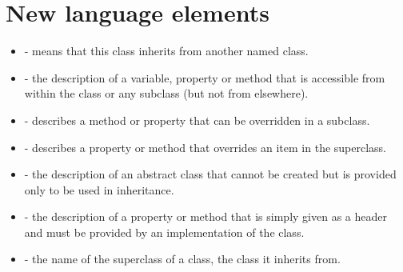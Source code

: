 	\section{New language elements}
		\begin{itemize}
      \item {} - means that this class inherits from another named class.
      \item {} - the description of a variable, property or method that is accessible from within the class or any subclass (but not from elsewhere).
      \item {} - describes a method or property that can be overridden in a subclass.
      \item {} - describes a property or method that overrides an item in the superclass.
      \item {} - the description of an abstract class that cannot be created but is provided only to be used in inheritance.
      \item {} - the description of a property or method that is simply given as a header and must be provided by an implementation of the class.
      \item {} - the name of the superclass of a class, the class it inherits from.
		\end{itemize}


